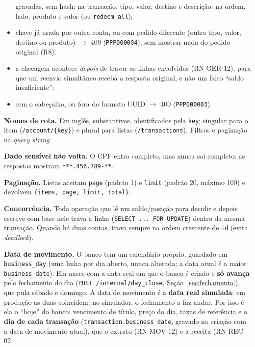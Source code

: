 \documentclass[11pt,a4paper]{article}
\newcommand{\obr}{\textbf{[OBR]}}          %
\newcommand{\dec}{\textbf{[DEC]}}          %
\newcommand{\tb}[1]{\texttt{#1}}           %
\begin{document}
\begin{regras}
\begin{itemize}
          gravadas, sem hash: na transação, tipo, valor, destino e descrição; na ordem, lado,
          produto e valor (ou \tb{redeem_all});
    \item chave já usada por outra conta, ou com pedido diferente (outro tipo, valor, destino ou
          produto) $\to$ 409 (\tb{PPP000004}), sem mostrar nada do pedido original (R8);
    \item a checagem acontece \emph{depois} de travar as linhas envolvidas (RN-GER-12), para que
          um reenvio simultâneo receba a resposta original, e não um falso ``saldo insuficiente'';
    \item sem o cabeçalho, ou fora do formato UUID $\to$ 400 (\tb{PPP000003}).
  \end{itemize}
  \item[RN-GER-09 \dec] \textbf{Nomes de rota.} Em inglês, substantivos, identificados pela
  \tb{key}; singular para o item (\tb{/account/\{key\}}) e plural para listas
  (\tb{/transactions}). Filtros e paginação na \emph{query string}.
  \item[RN-GER-10 \dec] \textbf{Dado sensível não volta.} O CPF entra completo, mas nunca sai
  completo: as respostas mostram \tb{***.456.789-**}.
  \item[RN-GER-11 \dec] \textbf{Paginação.} Listas aceitam \tb{page} (padrão 1) e \tb{limit}
  (padrão 20, máximo 100) e devolvem \tb{\{items, page, limit, total\}}.
  \item[RN-GER-12 \obr] \textbf{Concorrência.} Toda operação que lê um saldo/posição para decidir
  e depois escreve com base nele trava a linha (\tb{SELECT ... FOR UPDATE}) dentro da mesma
  transação. Quando há duas contas, trava sempre na ordem crescente de \tb{id} (evita
  \emph{deadlock}).
  \item[RN-GER-13 \dec] \textbf{Data de movimento.} O banco tem um calendário próprio, guardado
  em \tb{business_day} (uma linha por dia aberto, nunca alterada; a data atual é a maior
  \tb{business_date}). Ela nasce com a data real em que o banco é criado e \textbf{só avança} pelo
  fechamento do dia (\tb{POST /internal/day_close}, Seção~\ref{sec:fechamento}), que pula sábado e
  domingo. A data de movimento é a \textbf{data real simulada}: em produção as duas coincidem; no
  simulador, o fechamento a faz andar. Por isso é ela o ``hoje'' do banco: vencimento de título,
  preço do dia, taxas de referência e o \textbf{dia de cada transação} (\tb{transaction.business_date},
  gravado na criação com a data de movimento atual), que o extrato (RN-MOV-12) e a receita (RN-REC-02

\end{regras}
\end{document}
